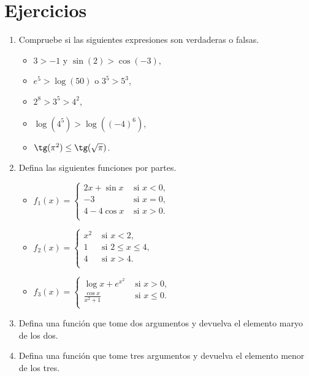 
\section*{Ejercicios}

\begin{enumerate}

	\item Compruebe si las siguientes expresiones son verdaderas o
		falsas.

		\begin{itemize}

			\item $3>-1$ y $\sin(2)>\cos(-3)$,

			\item $e^{5} > \log(50)$ o $3^{5} > 5^{3}$,

			\item $2^8>3^5>4^2$,

			\item $\log(4^5) > \log((-4)^6)$,

			\item $\tg(\pi^2) \leq \tg(\sqrt{\pi})$.

		\end{itemize}

	\item Defina las siguientes funciones por partes.

		\begin{itemize}

			\item $
				f_1(x)=\left\{\begin{array}{cl}
					2x+\sin x & \text{ si } x<0, \\
					-3 & \text{ si } x=0, \\
					4-4\cos x & \text{ si } x>0. \\
				\end{array}\right.
				$

			\item $
				f_2(x)=\left\{\begin{array}{cl}
					x^2 & \text{ si } x<2, \\
					1 & \text{ si } 2\leq x\leq 4, \\
					4 & \text{ si } x>4. \\
				\end{array}\right.
				$

			\item $
				f_3(x)=\left\{\begin{array}{cl}
					\log x + e^{x^2} & \text{ si } x>0, \\
					\frac{\cos x}{x^2+1}  & \text{ si } x\leq0. \\
				\end{array}\right.
				$
		\end{itemize}

	\item Defina una función  que tome dos argumentos
		y devuelva el elemento maryo de los dos.

	\item Defina una función  que tome tres argumentos
		y devuelva el elemento menor de los tres.

\end{enumerate}
